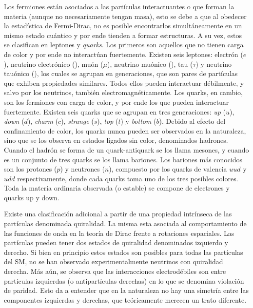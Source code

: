 Los fermiones están asociados a las partículas interactuantes o que forman la materia (aunque no necesariamente tengan masa), esto se debe a que al obedecer la estadística de Fermi-Dirac, no es posible encontrarlos simultáneamente en un mismo estado cuántico y por ende tienden a formar estructuras. A su vez, estos se clasifican en leptones y \textit{quarks}. Los primeros son aquellos que no tienen carga de color y por ende no interactúan fuertemente. Existen seis leptones: electrón ($e$), neutrino electrónico (\nue), muón ($\mu$), neutrino muónico (\numu), tau ($\tau$) y neutrino tauónico (\nutau), los cuales se agrupan en generaciones, que son pares de partículas que exhiben propiedades similares. Todos ellos pueden interactuar débilmente, y salvo por los neutrinos, también electromagnéticamente. Los quarks, en cambio, son los fermiones con carga de color, y por ende los que pueden interactuar fuertemente. Existen seis quarks que se agrupan en tres generaciones: \textit{up} ($u$), \textit{down} ($d$), \textit{charm} ($c$), \textit{strange} ($s$), \textit{top} ($t$) y \textit{bottom} ($b$). Debido al efecto del confinamiento de color, los quarks nunca pueden ser observados en la naturaleza, sino que se los observa en estados ligados sin color, denominados hadrones. Cuando el hadrón se forma de un quark-antiquark se los llama mesones, y cuando es un conjunto de tres quarks se los llama bariones. Los bariones más conocidos son los protones ($p$) y neutrones ($n$), compuesto por los quarks de valencia $uud$ y $udd$ respectivamente, donde cada quarks toma uno de los tres posibles colores. Toda la materia ordinaria observada (o estable) se compone de electrones y quarks up y down. 

Existe una clasificación adicional a partir de una propiedad intrínseca de las partículas denominada quiralidad. La misma esta asociada al comportamiento de las funciones de onda en la teoría de Dirac frente a rotaciones espaciales. Las partículas pueden tener dos estados de quiralidad denominados izquierdo y derecho. Si bien en principio estos estados son posibles para todas las partículas del SM, no se han observado experimentalmente neutrinos con quiralidad derecha. Más aún, se observa que las interacciones electrodébiles son entre partículas izquierdas (o antipartículas derechas) en lo que se denomina violación de paridad. Esto da a entender que en la naturaleza no hay una simetría entre las componentes izquierdas y derechas, que teóricamente merecen un trato diferente.


